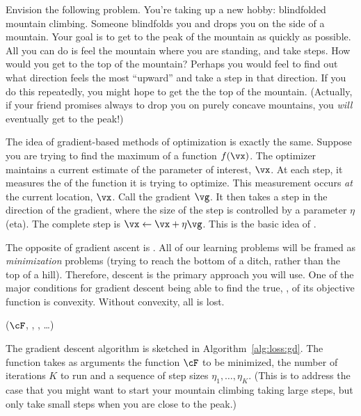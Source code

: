 Envision the following problem.  You're taking up a new hobby:
blindfolded mountain climbing.  Someone blindfolds you and drops you
on the side of a mountain.  Your goal is to get to the peak of the
mountain as quickly as possible.  All you can do is feel the mountain
where you are standing, and take steps.  How would you get to the top
of the mountain?  Perhaps you would feel to find out what direction
feels the most ``upward'' and take a step in that direction.  If you
do this repeatedly, you might hope to get the the top of the mountain.
(Actually, if your friend promises always to drop you on purely
concave mountains, you \emph{will} eventually get to the peak!)

The idea of gradient-based methods of optimization is exactly the
same.  Suppose you are trying to find the maximum of a function
$f(\vx)$.  The optimizer maintains a current estimate of the parameter
of interest, $\vx$.  At each step, it measures the 
of the function it is trying to optimize.  This measurement occurs
\emph{at} the current location, $\vx$.  Call the gradient $\vg$.  It
then takes a step in the direction of the gradient, where the size of
the step is controlled by a parameter $\eta$ (eta).  The complete step
is $\vx \leftarrow \vx + \eta \vg$.  This is the basic idea of
.

The opposite of gradient ascent is .  All of
our learning problems will be framed as \emph{minimization} problems
(trying to reach the bottom of a ditch, rather than the top of a
hill).  Therefore, descent is the primary approach you will use.
One of the major conditions for gradient descent being able to find the
true, , of its objective function is
convexity.  Without convexity, all is lost.


%
  {($\cF$, , , \dots)}
  {
\SETST{$\vz\kth$}{$\VARm{\vz\kpth} - \VARm{\eta}\VARm{\kth} \VARm{\vg\kth}$}
\ENDFOR
\RETURN \VARm{$\vz\Kth$}
}


The gradient descent algorithm is sketched in
Algorithm~\ref{alg:loss:gd}.  The function takes as arguments the
function $\cF$ to be minimized, the number of iterations $K$ to run
and a sequence of step sizes $\eta_1, \dots, \eta_K$.  (This is to
address the case that you might want to start your mountain climbing
taking large steps, but only take small steps when you are close to
the peak.)

